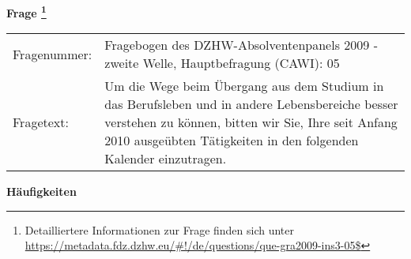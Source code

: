 				\vspace*{0.5cm}
                \noindent\textbf{Frage
	                \footnote{Detailliertere Informationen zur Frage finden sich unter
		              \url{https://metadata.fdz.dzhw.eu/\#!/de/questions/que-gra2009-ins3-05$}}}\\
				\begin{tabularx}{\hsize}{@{}lX}
					Fragenummer: &
					  Fragebogen des DZHW-Absolventenpanels 2009 - zweite Welle, Hauptbefragung (CAWI):
					  05
 \\
					Fragetext: & Um die Wege beim Übergang aus dem Studium in das Berufsleben und in andere Lebensbereiche besser verstehen zu können, bitten wir Sie, Ihre seit Anfang 2010 ausgeübten Tätigkeiten in den folgenden Kalender einzutragen. \\
				\end{tabularx}





        		\vspace*{0.5cm}
                \noindent\textbf{Häufigkeiten}

